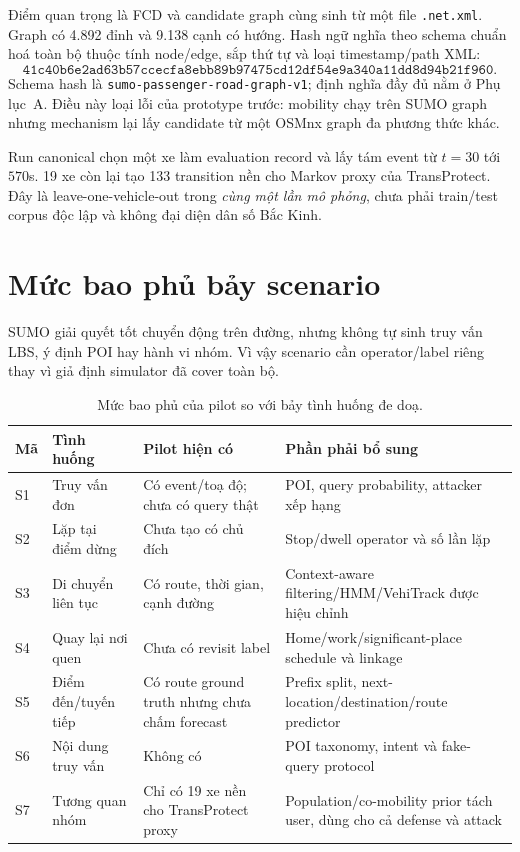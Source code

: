 \documentclass[12pt,a4paper,oneside]{report}
\begin{document}
Điểm quan trọng là FCD và candidate graph cùng sinh từ một file \texttt{.net.xml}. Graph có 4.892 đỉnh và 9.138 cạnh có hướng. Hash ngữ nghĩa theo schema chuẩn hoá toàn bộ thuộc tính node/edge, sắp thứ tự và loại timestamp/path XML:
\[
\texttt{41c40b6e2ad63b57ccecfa8ebb89b97475cd12df54e9a340a11dd8d94b21f960}.
\]
Schema hash là \texttt{sumo-passenger-road-graph-v1}; định nghĩa đầy đủ nằm ở Phụ lục~A. Điều này loại lỗi của prototype trước: mobility chạy trên SUMO graph nhưng mechanism lại lấy candidate từ một OSMnx graph đa phương thức khác.

Run canonical chọn một xe làm evaluation record và lấy tám event từ $t=30$ tới $570$s. 19 xe còn lại tạo 133 transition nền cho Markov proxy của TransProtect. Đây là leave-one-vehicle-out trong \emph{cùng một lần mô phỏng}, chưa phải train/test corpus độc lập và không đại diện dân số Bắc Kinh.

\section{Mức bao phủ bảy scenario}

SUMO giải quyết tốt chuyển động trên đường, nhưng không tự sinh truy vấn LBS, ý định POI hay hành vi nhóm. Vì vậy scenario cần operator/label riêng thay vì giả định simulator đã cover toàn bộ.

\begin{table}[htbp]
\centering
\footnotesize
\caption{Mức bao phủ của pilot so với bảy tình huống đe doạ.}
\label{tab:scenario-coverage}
\begin{tabularx}{\textwidth}{P{1.0cm}P{3.4cm}P{3.2cm}Y}
\toprule
\textbf{Mã} & \textbf{Tình huống} & \textbf{Pilot hiện có} & \textbf{Phần phải bổ sung} \\
\midrule
S1 & Truy vấn đơn & Có event/toạ độ; chưa có query thật & POI, query probability, attacker xếp hạng \\
S2 & Lặp tại điểm dừng & Chưa tạo có chủ đích & Stop/dwell operator và số lần lặp \\
S3 & Di chuyển liên tục & Có route, thời gian, cạnh đường & Context-aware filtering/HMM/VehiTrack được hiệu chỉnh \\
S4 & Quay lại nơi quen & Chưa có revisit label & Home/work/significant-place schedule và linkage \\
S5 & Điểm đến/tuyến tiếp & Có route ground truth nhưng chưa chấm forecast & Prefix split, next-location/destination/route predictor \\
S6 & Nội dung truy vấn & Không có & POI taxonomy, intent và fake-query protocol \\
S7 & Tương quan nhóm & Chỉ có 19 xe nền cho TransProtect proxy & Population/co-mobility prior tách user, dùng cho cả defense và attack \\
\bottomrule
\end{tabularx}
\end{table}
\end{document}
